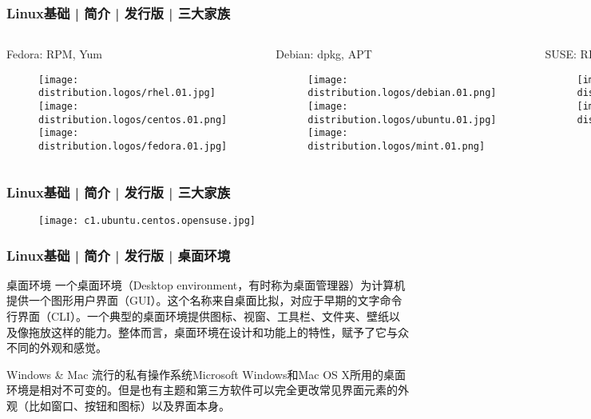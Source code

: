 \begin{frame}
  \frametitle{Linux基础 | 简介 | 发行版 | \alert{三大家族}}
  \begin{columns}
    \begin{block}{Fedora: RPM, Yum}
      \begin{figure}
        \centering
        \texttt{[image: distribution.logos/rhel.01.jpg]}\\
        \texttt{[image: distribution.logos/centos.01.png]}\\
        \texttt{[image: distribution.logos/fedora.01.jpg]}
      \end{figure}
    \end{block}
    \begin{block}{Debian: dpkg, APT}
      \begin{figure}
        \centering
        \texttt{[image: distribution.logos/debian.01.png]}\\
        \texttt{[image: distribution.logos/ubuntu.01.jpg]}\\
        \texttt{[image: distribution.logos/mint.01.png]}
      \end{figure}
    \end{block}
    \begin{block}{SUSE: RPM, Zypper}
      \begin{figure}
        \centering
        \texttt{[image: distribution.logos/suse.01.png]}\\
	\vspace{0.5cm}
        \texttt{[image: distribution.logos/opensuse.01.png]}
      \end{figure}
    \end{block}
  \end{columns}
\end{frame}

\begin{frame}
  \frametitle{Linux基础 | 简介 | 发行版 | \alert{三大家族}}
  \begin{figure}
    \centering
    \texttt{[image: c1.ubuntu.centos.opensuse.jpg]}
  \end{figure}
\end{frame}

\begin{frame}
  \frametitle{Linux基础 | 简介 | 发行版 | 桌面环境}
  \begin{block}{桌面环境}
    一个桌面环境（Desktop environment，有时称为桌面管理器）为计算机提供一个图形用户界面（GUI）。这个名称来自桌面比拟，对应于早期的文字命令行界面（CLI）。一个典型的桌面环境提供图标、视窗、工具栏、文件夹、壁纸以及像拖放这样的能力。整体而言，桌面环境在设计和功能上的特性，赋予了它与众不同的外观和感觉。
  \end{block}
  \pause
  \begin{block}{Windows \& Mac}
    流行的私有操作系统Microsoft Windows和Mac OS X所用的桌面环境是相对不可变的。但是也有主题和第三方软件可以完全更改常见界面元素的外观（比如窗口、按钮和图标）以及界面本身。
  \end{block}
\end{frame}

